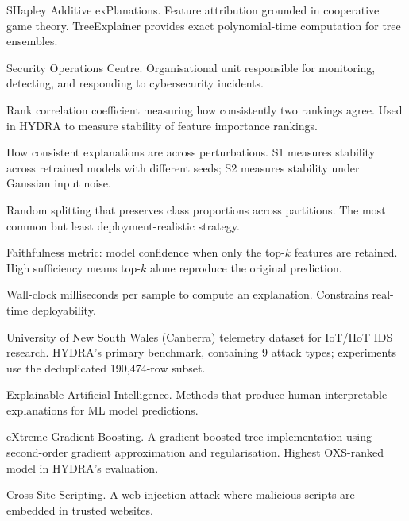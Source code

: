 \documentclass[12pt,a4paper]{report}
\begin{document}
\begin{description}[leftmargin=2.8cm,style=nextline,itemsep=0.2em]
\item[SHAP] SHapley Additive exPlanations. Feature attribution grounded in cooperative game theory. TreeExplainer provides exact polynomial-time computation for tree ensembles.

\item[SOC] Security Operations Centre. Organisational unit responsible for monitoring, detecting, and responding to cybersecurity incidents.

\item[Spearman $\rho$] Rank correlation coefficient measuring how consistently two rankings agree. Used in HYDRA to measure stability of feature importance rankings.

\item[Stability (S1, S2)] How consistent explanations are across perturbations. S1 measures stability across retrained models with different seeds; S2 measures stability under Gaussian input noise.

\item[Stratified split] Random splitting that preserves class proportions across partitions. The most common but least deployment-realistic strategy.

\item[Sufficiency] Faithfulness metric: model confidence when only the top-$k$ features are retained. High sufficiency means top-$k$ alone reproduce the original prediction.

\item[Timeliness] Wall-clock milliseconds per sample to compute an explanation. Constrains real-time deployability.

\item[TON\_IoT] University of New South Wales (Canberra) telemetry dataset for IoT/IIoT IDS research. HYDRA's primary benchmark, containing 9 attack types; experiments use the deduplicated 190,474-row subset.

\item[XAI] Explainable Artificial Intelligence. Methods that produce human-interpretable explanations for ML model predictions.

\item[XGBoost] eXtreme Gradient Boosting. A gradient-boosted tree implementation using second-order gradient approximation and regularisation. Highest OXS-ranked model in HYDRA's evaluation.

\item[XSS] Cross-Site Scripting. A web injection attack where malicious scripts are embedded in trusted websites.

\end{description}
\end{document}
